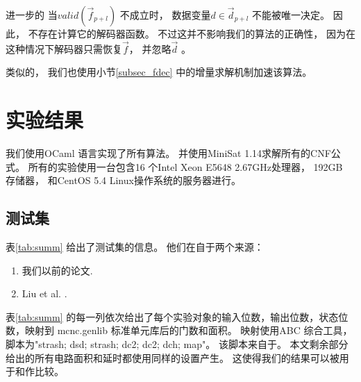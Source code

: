 进一步的
当$valid(\vec{f}_{p+l})$ 不成立时，
数据变量$d\in\vec{d}_{p+l}$ 不能被唯一决定。
因此，
不存在计算它的解码器函数。
不过这并不影响我们的算法的正确性，
因为在这种情况下解码器只需恢复$\vec{f}$，
并忽略$\vec{d}$ 。

类似的，
我们也使用小节\ref{subsec_fdec} 中的增量求解机制加速该算法。



\section{实验结果}\label{sec_exp_chap3}

我们使用OCaml 语言实现了所有算法。
并使用MiniSat 1.14求解所有的CNF公式。
所有的实验使用一台包含16 个Intel Xeon E5648 2.67GHz处理器，
192GB 存储器， 和CentOS 5.4 Linux操作系统的服务器进行。

\subsection{测试集}
表\ref{tab:summ} 给出了测试集的信息。
他们在自于两个来源：
\begin{enumerate}
 \item 我们以前的论文.
 \item Liu et al. .
\end{enumerate}

表\ref{tab:summ} 的每一列依次给出了每个实验对象的输入位数，输出位数，状态位数，映射到 mcnc.genlib 标准单元库后的门数和面积。
映射使用ABC 综合工具，
脚本为"strash; dsd; strash; dc2; dc2; dch; map"。
该脚本来自于。
本文剩余部分给出的所有电路面积和延时都使用同样的设置产生。
这使得我们的结果可以被用于和作比较。

